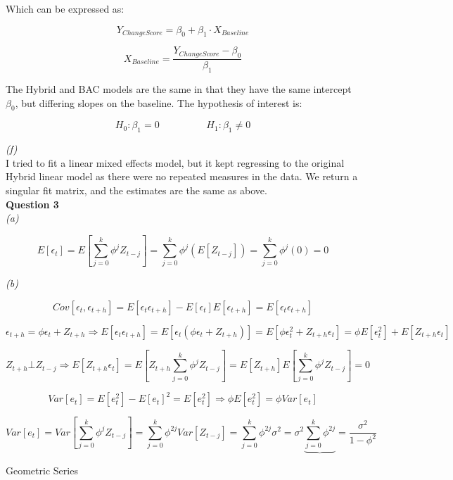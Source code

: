 \documentclass[11pt,a4paper]{article}
\begin{document}
Which can be expressed as:

$$ Y_{Change Score} = \beta_0 + \beta_1 \cdot X_{Baseline} $$

$$ X_{Baseline} = \dfrac{Y_{Change Score} - \beta_0}{\beta_1} $$

The Hybrid and BAC models are the same in that they have the same intercept $\beta_0$, but differing slopes on the baseline. The hypothesis of interest is:

$$ H_0 : \beta_1 = 0 \hspace{2cm} H_1 : \beta_1 \neq 0 $$

\textit{(f)}\\

I tried to fit a linear mixed effects model, but it kept regressing to the original Hybrid linear model as there were no repeated measures in the data. We return a singular fit matrix, and the estimates are the same as above.\\

\textbf{Question 3}\\

\textit{(a)}

$$ E [ \epsilon_t ] = E \left[ \sum_{j=0}^k \phi^j Z_{t-j} \right] = \sum_{j=0}^k \phi^j \left( E \left[ Z_{t-j} \right] \right) = \sum_{j=0}^k \phi^j \left( 0 \right) = 0$$

\newpage
\textit{(b)}

$$ Cov [ \epsilon_t, \epsilon_{t+h} ] = E [ \epsilon_t \epsilon_{t+h} ] - E [ \epsilon_t ] E [ \epsilon_{t+h} ] = E [ \epsilon_t \epsilon_{t+h} ] $$

$$ \epsilon_{t+h} = \phi \epsilon_t + Z_{t+h} \Rightarrow E [ \epsilon_t \epsilon_{t+h} ] = E [ \epsilon_t \left( \phi \epsilon_t + Z_{t+h} \right) ] = E [ \phi \epsilon_t^2 + Z_{t+h} \epsilon_t ] = \phi E [ \epsilon_t^2 ] + E [ Z_{t+h} \epsilon_t ] $$

$$ Z_{t+h} \bot Z_{t-j} \Rightarrow E [ Z_{t+h} \epsilon_t ] = E \left[ Z_{t+h} \sum_{j=0}^k \phi^j Z_{t-j} \right] = E [ Z_{t+h} ] E \left[ \sum_{j=0}^k \phi^j Z_{t-j} \right] = 0 $$

$$ Var [ e_t ] = E [ e_t^2 ] - E [ e_t ]^2 = E [ e_t^2 ] \Rightarrow \phi E [ e_t^2 ] = \phi Var [e_t] $$

$$ Var [e_t] = Var \left[ \sum_{j=0}^k \phi^j Z_{t-j} \right] = \sum_{j=0}^k \phi^{2j} Var [ Z_{t-j} ] =  \sum_{j=0}^k \phi^{2j} \sigma^2 = \sigma^2  \underbrace{\sum_{j=0}^k \phi^{2j}} = \dfrac{\sigma^2}{1 - \phi^2} $$

\hspace{11cm} Geometric Series
\end{document}

